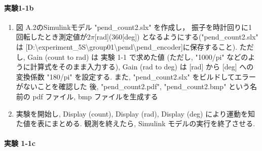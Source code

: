 \paragraph{実験1-1b}
\begin{enumerate}
  \item 図 A.2のSimulinkモデル "pend\_count2.slx" を作成し，
        振子を時計回りに1 回転したとき測定値が2\(\pi\)[rad](360[deg]) 
        となるようにする("pend\_count2.slx" は [D:\textbackslash experiment\_5S\textbackslash group01\textbackslash pend\textbackslash pend\_encoder]に保存すること). 
        ただし, Gain (count to rad) は 実験 1-1 で求めた値 
        (ただし, "1000/pi" などのように計算式をそのまま入力する), 
        Gain (rad to deg) は [rad] から [deg] への
        変換係数 "180/pi" を設定する. 
        また, "pend\_count2.slx" をビルドしてエラーがないことを確認した
        後, "pend\_count2.pdf", "pend\_count2.bmp" という名前の 
        pdf ファイル, bmp ファイルを生成する
        
  \item 実験を開始し, Display (count), Display (rad), Display (deg) により運動を知た値を表にまとめる.
        観測を終えたら, Simulink モデルの実行を終了させる.
\end{enumerate}

\paragraph{実験 1-1c}

